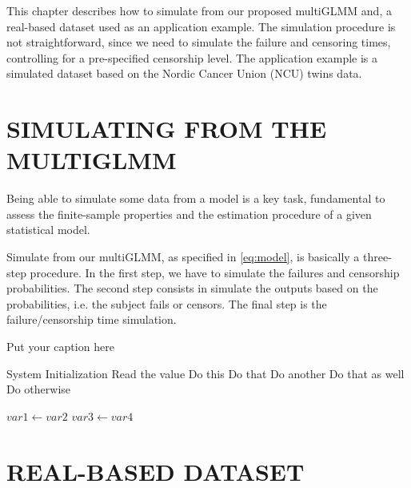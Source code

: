 This chapter describes how to simulate from our proposed multiGLMM and,
a real-based dataset used as an application example. The simulation
procedure is not straightforward, since we need to simulate the failure
and censoring times, controlling for a pre-specified censorship level.
The application example is a simulated dataset based on the Nordic
Cancer Union (NCU) twins data.

\section{SIMULATING FROM THE MULTIGLMM}
\label{cap:simu}

Being able to simulate some data from a model is a key task, fundamental
to assess the finite-sample properties and the estimation procedure of a
given statistical model.

Simulate from our multiGLMM, as specified in \autoref{eq:model}, is
basically a three-step procedure. In the first step, we have to simulate
the failures and censorship probabilities. The second step consists in
simulate the outputs based on the probabilities, i.e. the subject fails
or censors. The final step is the failure/censorship time simulation.

\begin{algorithm}
\caption{Put your caption here}
\begin{algorithmic}[1]

       
    \State System Initialization
    \State Read the value
        \State Do this
        \State Do that
        \State Do another
        \State Do that as well
        \Else
        \State Do otherwise
        \EndIf
    \EndIf

      
        \State $var1 \leftarrow var2$  
        \State $var3 \leftarrow var4$
    \EndWhile  \label{roy's loop}
\EndProcedure

\end{algorithmic}
\end{algorithm}

\section{REAL-BASED DATASET}
\label{cap:data}


